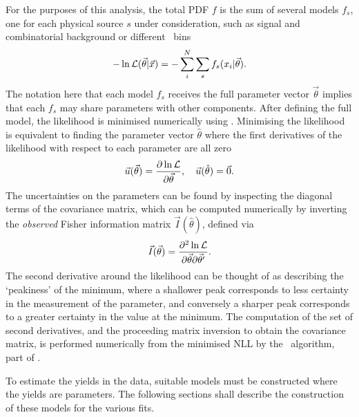 For the purposes of this analysis, the total \ac{PDF} $f$ is the sum of several 
models $f_{s}$, one for each physical source $s$ under consideration, such as 
signal and combinatorial background or different \pTy\ bins
\begin{equation}
  -\ln{\ensuremath{\mathcal{L}}(\vec{\theta}|\vec{x})} =
  -\sum_{i}^{N} \sum_{s} f_{s}(x_{i}|\vec{\theta}).
\end{equation}
The notation here that each model $f_{s}$ receives the full parameter vector 
$\vec{\theta}$ implies that each $f_{s}$ may share parameters with other 
components.
After defining the full model, the likelihood is minimised numerically using 
\minuit.
Minimising the likelihood is equivalent to finding the parameter vector 
$\hat{\theta}$ where the first derivatives of the likelihood with respect to 
each parameter are all zero
\begin{equation}
  \vec{u}(\vec{\theta}) = \frac{%
    \partial\ln{\likelihood}
  }{%
    \partial\vec{\theta}
  },\quad
  \vec{u}(\hat{\theta}) = \vec{0}.
\end{equation}
The uncertainties on the parameters can be found by inspecting the diagonal 
terms of the covariance matrix, which can be computed numerically by inverting 
the \emph{observed} Fisher information matrix $\vec{I}(\hat{\theta})$, defined 
via
\begin{equation}
  \vec{I}(\vec{\theta}) = \frac{%
    \partial^{2}\ln{\likelihood}
  }{%
    \partial\vec{\theta}\partial\vec{\theta}'
  }.
\end{equation}
The second derivative around the likelihood can be thought of as describing the 
`peakiness' of the minimum, where a shallower peak corresponds to less 
certainty in the measurement of the parameter, and conversely a sharper peak 
corresponds to a greater certainty in the value at the minimum.
The computation of the set of second derivatives, and the proceeding matrix 
inversion to obtain the covariance matrix, is performed numerically from the 
minimised \ac{NLL} by the \hesse\ algorithm, part of \minuit.

To estimate the yields in the data, suitable models must be constructed where 
the yields are parameters.
The following sections shall describe the construction of these models for the 
various fits.

